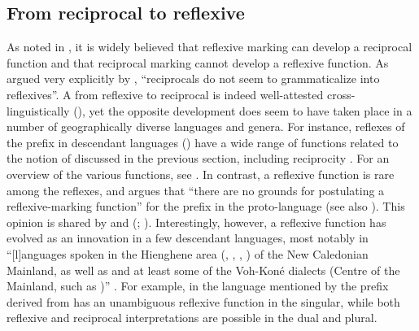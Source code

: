 \subsection{From reciprocal to reflexive} \label{diachrony:recp2refl}
As noted in , it is widely believed that reflexive marking can develop a reciprocal function and that reciprocal marking cannot develop a reflexive function. As argued very explicitly by \citet[216]{heine:miyashita:2008}, “reciprocals do not seem to grammaticalize into reflexives”. A  from reflexive to reciprocal is indeed well-attested cross-linguistically (), yet the opposite development does seem to have taken place in a number of geographically diverse languages and genera. For instance, reflexes of the  prefix  \citep[150ff.]{pawley:1973} in descendant languages () have a wide range of functions related to the notion of  discussed in the previous section, including reciprocity \citep{lichtenberk:2000}. For an overview of the various functions, see \citet[28]{bril:2005}. In contrast, a reflexive function is rare among the reflexes, and \citet[32]{lichtenberk:2000} argues that “there are no grounds for postulating a reflexive-marking function” for the prefix  in the proto-language (see also \citeyear[181]{lichtenberk:1991}). This opinion is shared by \citet[32]{bril:2005} and \citeauthor{moyse-faurie:2008} (\citeyear[106]{moyse-faurie:2008}; \citeyear[108]{moyse-faurie:2017}). Interestingly, however, a reflexive function has evolved as an innovation in a few descendant languages, most notably in “[l]anguages spoken in the Hienghene area (, , , ) of the New Caledonian Mainland, as well as  and at least some of the Voh-Koné dialects (Centre of the Mainland, such as )” \citep[122]{moyse-faurie:2017}. For example, in the  language mentioned by \citeauthor{moyse-faurie:2017} the prefix  derived from   has an unambiguous reflexive function in the singular, while both reflexive and reciprocal interpretations are possible in the dual and plural. 

